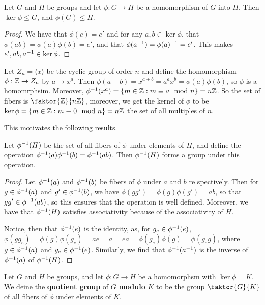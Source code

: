 \begin{proposition}\label{proposition_3.1.2}
  Let $G$ and  $H$ be groups and let  $\phi:G \rightarrow H$ be a homomorphism
  of $G$ into  $H$. Then $\ker{\phi} \leq G$, and $\phi(G) \leq H$.
\end{proposition}
\begin{proof}
  We have that $\phi(e)=e'$ and for any $a,b \in \ker{\phi}$, that
  $\phi(ab)=\phi(a)\phi(b)=e'$, and that $\phi(a^{-1})=\phi(a)^{-1}=e'$.
  This makes $e',ab, a^{-1} \in \ker{\phi}$.
\end{proof}

\begin{example}\label{example_3.1}
  Let $Z_n=\langle x \rangle$ be the cyclic group of order $n$ and define the
  homomorphism  $\phi:\mathbb{Z} \rightarrow Z_n$ by $a \rightarrow x^a$. Then
  $\phi(a+b)=x^{a+b}=a^ax^b=\phi(a)\phi(b)$, so $\phi$ is a homomrphsim.
  Moreover,  $\phi^{-1}(x^a)=\{m \in \mathbb{Z} : m \equiv a \mod{n}\}=n\mathbb{Z}$. So the
  set of fibers is $\faktor{\Z}{n\Z}$, moreover, we get the kernel of $\phi$
  to be  $\ker{\phi}=\{m \in \mathbb{Z} : m \equiv 0 \mod{n}\}=n\mathbb{Z}$ the set of all
  multiples of $n$.
\end{example}

This motivates the following results.

\begin{theorem}\label{theorem_3.1.3}
  Let $\phi^{-1}(H)$ be the set of all fibers of $\phi$ under elements of
  $H$, and define the operation $\phi^{-1}(a)\phi^{-1}(b)=\phi^{-1}(ab)$.
  Then $\phi^{-1}(H)$ forms a group under this operation.
\end{theorem}
\begin{proof}
  Let $\phi^{-1}(a)$ and $\phi^{-1}(b)$ be fibers of  $\phi$ under  $a$ and
  $b$ re spectively. Then for $g \in \phi^{-1}(a)$ and  $g' \in
  \phi^{-1}(b)$, we have  $\phi(gg')=\phi(g)\phi(g')=ab$, so that $gg' \in
  \phi^{-1}(ab)$, so this ensures that the operation is well defined.
  Moreover, we have that $\phi^{-1}(H)$ satisfies associativity because of
  the associativity of  $H$.

  Notice, then that  $\phi^{-1}(e)$ is the identity, as, for $g_e \in
  \phi^{-1}(e)$, $\phi(gg_e)=\phi(g)\phi(g_e)=ae=a=ea=\phi(g_e)\phi(g)=
  \phi(g_eg)$, where $g \in \phi^{-1}(a)$ and $g_e \in \phi^{-1}(e)$.
  Similarly, we find that $\phi^{-1}(a^{-1})$ is the inverse of $\phi^{-1}(a)$
  of $\phi^{-1}(H)$.
\end{proof}

\begin{definition}
  Let $G$ and  $H$ be groups, and let  $\phi:G \rightarrow H$ be a homomorphsm
  with $\ker{\phi}=K$. We deine the \textbf{quotient group} of $G$
  \textbf{modulo} $K$ to be the group $\faktor{G}{K}$ of all fibers of $\phi$
  under elements of $K$.
\end{definition}

